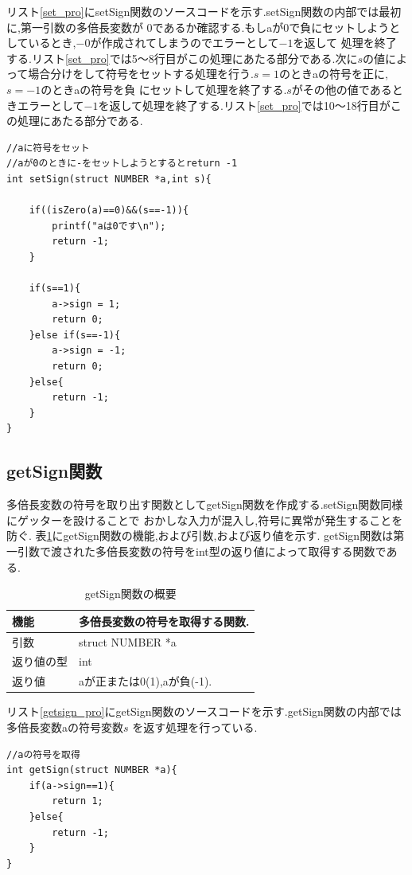 \documentclass[a4j] {jarticle}
\begin{document}
  リスト\ref{set_pro}にsetSign関数のソースコードを示す.setSign関数の内部では最初に,第一引数の多倍長変数が
  0であるか確認する.もしaが0で負にセットしようとしているとき,$-0$が作成されてしまうのでエラーとして$-1$を返して
  処理を終了する.リスト\ref{set_pro}では5～8行目がこの処理にあたる部分である.次に$s$の値によって場合分けをして符号をセットする処理を行う.$s=1$のときaの符号を正に,$s=-1$のときaの符号を負
  にセットして処理を終了する.$s$がその他の値であるときエラーとして$-1$を返して処理を終了する.リスト\ref{set_pro}では10～18行目がこの処理にあたる部分である.
  \begin{lstlisting}[basicstyle=\ttfamily\footnotesize, frame=single,label=set_pro,caption=setSign関数のソースコード]
//aに符号をセット 
//aが0のときに-をセットしようとするとreturn -1
int setSign(struct NUMBER *a,int s){

    if((isZero(a)==0)&&(s==-1)){
        printf("aは0です\n");
        return -1;
    }

    if(s==1){
        a->sign = 1;
        return 0;
    }else if(s==-1){
        a->sign = -1;
        return 0;
    }else{
        return -1;
    }
}    
  \end{lstlisting}


\subsection{getSign関数}
多倍長変数の符号を取り出す関数としてgetSign関数を作成する.setSign関数同様にゲッターを設けることで
おかしな入力が混入し,符号に異常が発生することを防ぐ.
表\ref{getSign}にgetSign関数の機能,および引数,および返り値を示す.
getSign関数は第一引数で渡された多倍長変数の符号をint型の返り値によって取得する関数である.
\begin{table}[H]
  \caption{getSign関数の概要}
  \label{getSign}
  \begin{center}
      \begin{tabular}{|l|l|}\hline
      機能 & 多倍長変数の符号を取得する関数.\\ \hline
      引数 & struct NUMBER *a\\ \hline
      返り値の型 & int\\ \hline
      返り値 & aが正または0(1),aが負(-1).\\ \hline
      \end{tabular}
  \end{center}
  \end{table}

  リスト\ref{getsign_pro}にgetSign関数のソースコードを示す.getSign関数の内部では多倍長変数aの符号変数$s$
  を返す処理を行っている.
  \begin{lstlisting}[basicstyle=\ttfamily\footnotesize, frame=single,label=getsign_pro,caption=getSign関数のソースコード]
//aの符号を取得
int getSign(struct NUMBER *a){
    if(a->sign==1){
        return 1;
    }else{
        return -1;
    }
}
  \end{lstlisting}
\end{document}
